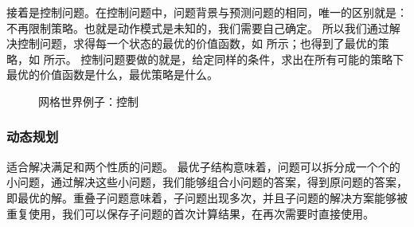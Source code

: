 接着是控制问题。在控制问题中，问题背景与预测问题的相同，唯一的区别就是：不再限制策略。也就是动作模式是未知的，我们需要自己确定。
 所以我们通过解决控制问题，求得每一个状态的最优的价值函数，如 所示；也得到了最优的策略，如 所示。
 控制问题要做的就是，给定同样的条件，求出在所有可能的策略下最优的价值函数是什么，最优策略是什么。
 \begin{figure}[hbt]
  \centering
  \caption{网格世界例子：控制}
  \label{fig:control_example}
\end{figure} 

\subsubsection{动态规划}

适合解决满足和两个性质的问题。
最优子结构意味着，问题可以拆分成一个个的小问题，通过解决这些小问题，我们能够组合小问题的答案，得到原问题的答案，即最优的解。重叠子问题意味着，子问题出现多次，并且子问题的解决方案能够被重复使用，我们可以保存子问题的首次计算结果，在再次需要时直接使用。

